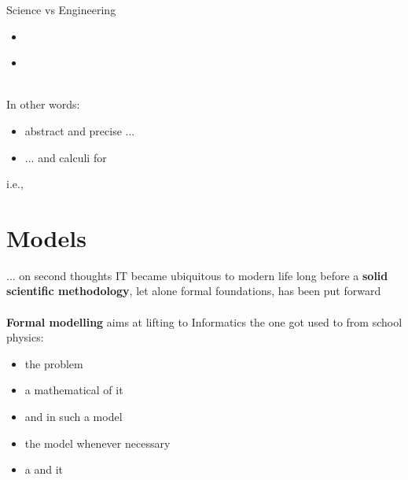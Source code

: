 \documentclass{beamer}
\begin{document}
\begin{slide}{Science vs Engineering}
\begin{itemize}
\item \emph{} 
\item \emph{} 
\end{itemize}
~\\
In other words:
\begin{itemize}
\item abstract and precise  ...
\item ... and calculi for 
\end{itemize}
i.e.,
\begin{flushright}
\end{flushright}
\end{slide} 




\section{Models}



\begin{slide}{... on second thoughts}
IT became ubiquitous to modern life long before a \textbf{solid scientific methodology},
 let alone formal foundations, has been put forward\\~\\
 
 \pause
\textbf{Formal modelling} aims at lifting to Informatics the   one got used to from
school physics:
\vspace{0.1cm}
\begin{itemize}
\item {} the problem
\item {} a mathematical  of it
\item {}  and  in such a model
\item {} the model whenever necessary
\item {} a  and  it
\end{itemize}
\end{slide}
\end{document}
